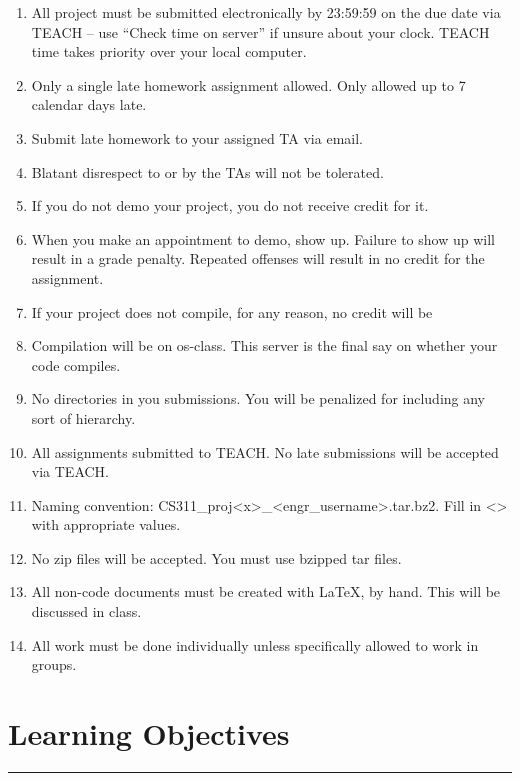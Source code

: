 \documentclass[letterpaper,10pt,fleqn]{article}
\numberwithin{equation}{section}
\begin{document}
\begin{enumerate}
\item All project must be submitted electronically by 23:59:59 on the due date via TEACH -- use ``Check
time on server'' if unsure about your clock. TEACH time takes priority over your local computer.
\item Only a single late homework assignment allowed. Only allowed up to 7 calendar days late.
\item Submit late homework to your assigned TA via email.
\item Blatant disrespect to or by the TAs will not be tolerated.
\item If you do not demo your project, you do not receive credit for it.
\item When you make an appointment to demo, show up. Failure to show up will result in a grade penalty.
Repeated offenses will result in no credit for the assignment.
\item If your project does not compile, for any reason, no credit will be
\item Compilation will be on os-class. This server is the final say on whether your code compiles.
\item No directories in you submissions. You will be penalized for including any sort of hierarchy.
\item All assignments submitted to TEACH. No late submissions will be accepted via TEACH.
\item Naming convention: CS311\_proj\textless{}x\textgreater{}\_\textless{}engr\_username\textgreater{}.tar.bz2. Fill in \textless{}\textgreater{} with appropriate values.
\item No zip files will be accepted. You must use bzipped tar files.
\item All non-code documents must be created with LaTeX, by hand. This will be discussed in class.
\item All work must be done individually unless specifically allowed to work in groups.
\end{enumerate}

\section*{Learning Objectives}
\hrule
\end{document}
